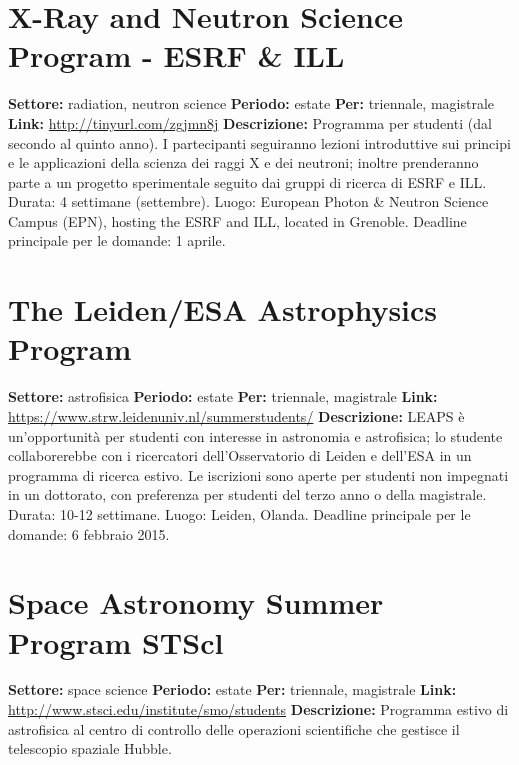 \documentclass[a4paper,10pt]{article}
\begin{document}
\section{X-Ray and Neutron Science Program - ESRF \& ILL}	
\textbf{Settore:} radiation, neutron science\newline
\textbf{Periodo:} estate\newline
\textbf{Per:} triennale, magistrale\newline
\textbf{Link:} \url{http://tinyurl.com/zgjmn8j} \newline
\textbf{Descrizione:} Programma per studenti (dal secondo al quinto anno). I partecipanti seguiranno lezioni introduttive sui principi e le applicazioni della scienza dei raggi X e dei neutroni; inoltre prenderanno parte a un progetto sperimentale seguito dai gruppi di ricerca di ESRF e ILL. Durata: 4 settimane (settembre). Luogo: European Photon \& Neutron Science Campus (EPN), hosting the ESRF and ILL, located in Grenoble. Deadline principale per le domande: 1 aprile.

\section{The Leiden/ESA Astrophysics Program}
\textbf{Settore:} astrofisica\newline
\textbf{Periodo:} estate \newline
\textbf{Per:} triennale, magistrale\newline
\textbf{Link:} \url{https://www.strw.leidenuniv.nl/summerstudents/} \newline
\textbf{Descrizione:} LEAPS è un’opportunità per studenti con interesse in astronomia e astrofisica; lo studente collaborerebbe con i ricercatori dell'Osservatorio di Leiden e dell’ESA in un programma di ricerca estivo. Le iscrizioni sono aperte per studenti non impegnati in un dottorato, con preferenza per studenti del terzo anno o della magistrale. Durata: 10-12 settimane. Luogo: Leiden, Olanda. Deadline principale per le domande: 6 febbraio 2015.

\section{Space Astronomy Summer Program STScl}
\textbf{Settore:} space science\newline
\textbf{Periodo:} estate\newline
\textbf{Per:} triennale, magistrale\newline
\textbf{Link:} \url{http://www.stsci.edu/institute/smo/students} \newline
\textbf{Descrizione:} Programma estivo di astrofisica al centro di controllo delle operazioni scientifiche che gestisce il telescopio spaziale Hubble.	
\end{document}
